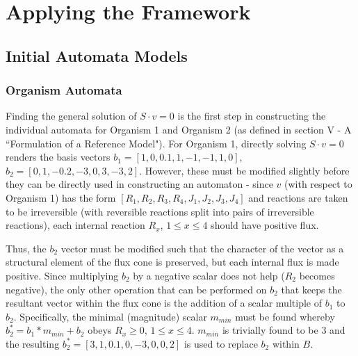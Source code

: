 \chapter{Applying the Framework}\label{chap:results}

\section{Initial Automata Models}
\label{sec:results}
\subsection{Organism Automata}

Finding the general solution of $S \cdot v = 0$ is the first step in constructing the individual automata for Organism 1 and Organism 2 (as defined in section V - A ``Formulation of a Reference Model"). For Organism 1, directly solving $S \cdot v = 0$ renders the basis vectors $b_1 = [1, 0, 0.1, 1, -1, -1, 1, 0]$, $b_2 = [0, 1, -0.2, -3, 0, 3, -3, 2]$. However, these must be modified slightly before they can be directly used in constructing an automaton - since $v$ (with respect to Organism 1) has the form $[R_1, R_2, R_3, R_4, J_1, J_2, J_3, J_4]$ and reactions are taken to be irreversible (with reversible reactions split into pairs of irreversible reactions), each internal reaction $R_x$, $1 \leq x \leq 4$ should have positive flux.

Thus, the $b_2$ vector must be modified such that the character of the vector as a structural element of the flux cone is preserved, but each internal flux is made positive. Since multiplying $b_2$ by a negative scalar does not help ($R_2$ becomes negative), the only other operation that can be performed on $b_2$ that keeps the resultant vector within the flux cone is the addition of a scalar multiple of $b_1$ to $b_2$. Specifically, the minimal (magnitude) scalar $m_{min}$ must be found whereby $b_2^* = b_1 * m_{min} + b_2$ obeys $R_x \geq 0$, $1 \leq x \leq 4$. $m_{min}$ is trivially found to be 3 and the resulting $b_2^* = [3, 1, 0.1, 0, -3, 0, 0, 2]$ is used to replace $b_2$ within $B$.

